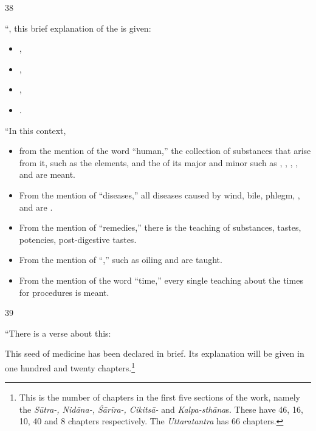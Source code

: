 \begin{translation}
    \item [38] 
    
“, this brief explanation of the 
    is given: \begin{itemize}
        \item    
        ,
        \item
        ,
        \item
        ,
        \item
        .
    \end{itemize}
“In this context, 
    \begin{itemize}
        \item from the mention of the word “human,” the collection of 
        substances that arise from it, such as the elements, and the 
         of its major 
        and minor  such as 
        , 
        , 
        , 
        , 
         and 
        are meant.
        \item
        From the mention of “diseases,” all diseases 
        caused by
        wind, bile, phlegm,
        ,
         and 
         are .
        \item
        From the mention of “remedies,”
        there is the teaching of 
        substances,
        tastes, 
        potencies,
        post-digestive tastes.
        \item
        From the mention of 
        “,”
         such as oiling
        and 
         are taught.
        \item
        From the mention of the word “time,” every single teaching about the times for
        procedures is meant.        
    \end{itemize}
  
    
    \item[39]
    
 “There is a verse about this:
    \begin{sloka}
        This seed of medicine has been declared in brief.  Its explanation will be given in one 
        hundred and twenty chapters.\footnote{This is the number of chapters in the first 
        five sections of the work, namely the  \emph{Sūtra-, Nidāna-, Śārīra-, Cikitsā-} 
        and \emph{Kalpa-sthāna}s. These have 46, 16, 10, 40 and 8 chapters respectively.  The 
        \emph{Uttaratantra} has 66 chapters.}
\end{sloka}


\end{translation}
